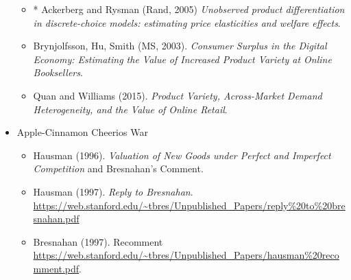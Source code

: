 \documentclass[11pt]{article}
\begin{document}
\begin{itemize}
\begin{itemize}
\item * Ackerberg and Rysman (Rand, 2005) \textit{Unobserved product differentiation in discrete-choice models: estimating price elasticities and welfare effects}.
\item Brynjolfsson, Hu, Smith (MS, 2003). \textit{Consumer Surplus in the Digital Economy: Estimating the Value of Increased Product Variety at Online Booksellers}.
\item Quan and Williams (2015). \textit{Product Variety, Across-Market Demand Heterogeneity, and the Value of Online Retail}.
\end{itemize}
\item Apple-Cinnamon Cheerios War
\begin{itemize}
\item Hausman (1996). \textit{Valuation of New Goods under Perfect and Imperfect Competition} and Bresnahan's Comment.
\item Hausman (1997). \textit{Reply to Bresnahan}. \url{https://web.stanford.edu/~tbres/Unpublished_Papers/reply%20to%20bresnahan.pdf}
\item Bresnahan (1997). Recomment \url{https://web.stanford.edu/~tbres/Unpublished_Papers/hausman%20recomment.pdf}.
\end{itemize}
\end{itemize}
\end{document}
